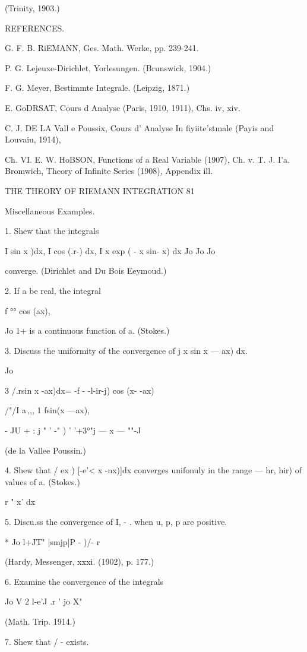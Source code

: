 (Trinity, 1903.)

REFERENCES.

G. F. B. RiEMANN, Ges. Math. Werke, pp. 239-241.

P. G. Lejeuxe-Dirichlet, Yorlesungen. (Brunswick, 1904.)

F. G. Meyer, Bestimmte Integrale. (Leipzig, 1871.)

E. GoDRSAT, Cours d Analyse (Paris, 1910, 1911), Chs. iv, xiv.

C. J. DE LA Vall e Poussix, Cours d' Analyse In fiyiite'stmale (Payis
and Louvaiu, 1914),

Ch. VI. E. W. HoBSON, Functions of a Real Variable (1907), Ch. v. T.
J. I'a. Bromwich, Theory of Infinite Series (1908), Appendix ill.



THE THEORY OF RIEMANN INTEGRATION 81

Miscellaneous Examples.

1. Shew that the integrals

I sin x )dx, I cos (.r-) dx, I x exp ( - x sin- x) dx Jo Jo Jo

converge. (Dirichlet and Du Bois Eeymoud.)

2. If a be real, the integral

f °° cos (ax),

Jo 1+ is a continuous function of a. (Stokes.)

3. Discuss the uniformity of the convergence of j x sin x — ax) dx.

Jo

3 /.rsin x -ax)dx= -f - -l-ir-j) cos (x- -ax)

/"/I a\,,,, 1 fsin(x —ax), ~\

- JU + : j " ' -" ) ' '+3°"j — x — ""-J

(de la Vallee Poussin.)

4. Shew that / ex ) [-e'< x -nx)]dx converges unifonuly in the range —
hr, hir) of values of a. (Stokes.)

r " x' dx

5. Discu.ss the convergence of I, - . when u, p, p are positive.

* Jo l+JT" |smjp|P - )/- r

(Hardy, Messenger, xxxi. (1902), p. 177.)

6. Examine the convergence of the integrals

Jo V 2 l-e'J .r ' jo X"

(Math. Trip. 1914.)

7. Shew that / - exists.

